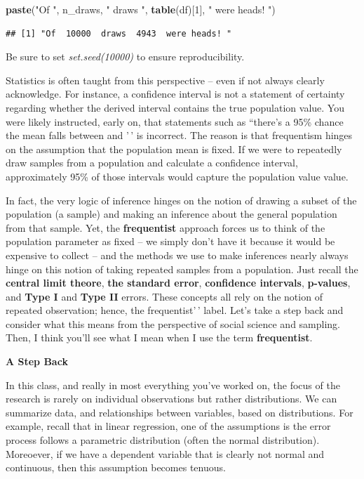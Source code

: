 \documentclass[
]{book}
\newenvironment{Shaded}{\begin{snugshade}}{\end{snugshade}}
\newcommand{\DecValTok}[1]{\textcolor[rgb]{0.00,0.00,0.81}{#1}}
\newcommand{\FunctionTok}[1]{\textcolor[rgb]{0.13,0.29,0.53}{\textbf{#1}}}
\newcommand{\NormalTok}[1]{#1}
\newcommand{\StringTok}[1]{\textcolor[rgb]{0.31,0.60,0.02}{#1}}
\begin{document}
\begin{Shaded}
\begin{Highlighting}[]
\FunctionTok{paste}\NormalTok{(}\StringTok{"Of "}\NormalTok{, n\_draws, }\StringTok{" draws "}\NormalTok{,  }\FunctionTok{table}\NormalTok{(df)[}\DecValTok{1}\NormalTok{], }\StringTok{" were heads! "}\NormalTok{)}
\end{Highlighting}
\end{Shaded}

\begin{verbatim}
## [1] "Of  10000  draws  4943  were heads! "
\end{verbatim}

Be sure to set \emph{set.seed(10000)} to ensure reproducibility.

Statistics is often taught from this perspective -- even if not always clearly acknowledge. For instance, a confidence interval is not a statement of certainty regarding whether the derived interval contains the true population value. You were likely instructed, early on, that statements such as ``there's a 95\% chance the mean falls between and '\,' is incorrect. The reason is that frequentism hinges on the assumption that the population mean is fixed. If we were to repeatedly draw samples from a population and calculate a confidence interval, approximately 95\% of those intervals would capture the population value value.

In fact, the very logic of inference hinges on the notion of drawing a subset of the population (a sample) and making an inference about the general population from that sample. Yet, the \textbf{frequentist} approach forces us to think of the population parameter as fixed -- we simply don't have it because it would be expensive to collect -- and the methods we use to make inferences nearly always hinge on this notion of taking repeated samples from a population. Just recall the \textbf{central limit theore}, \textbf{the standard error}, \textbf{confidence intervals}, \textbf{p-values}, and \textbf{Type I} and \textbf{Type II} errors. These concepts all rely on the notion of repeated observation; hence, the frequentist'\,' label. Let's take a step back and consider what this means from the perspective of social science and sampling. Then, I think you'll see what I mean when I use the term \textbf{frequentist}.

\textbf{A Step Back}

In this class, and really in most everything you've worked on, the focus of the research is rarely on individual observations but rather distributions. We can summarize data, and relationships between variables, based on distributions. For example, recall that in linear regression, one of the assumptions is the error process follows a parametric distribution (often the normal distribution). Moreoever, if we have a dependent variable that is clearly not normal and continuous, then this assumption becomes tenuous.
\end{document}
